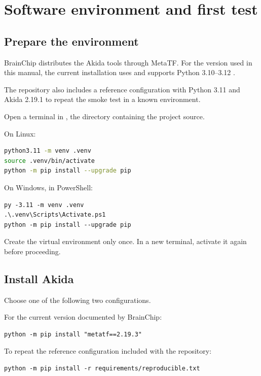 \chapter{Software environment and first test}
\label{chap:software}

\section{Prepare the environment}

BrainChip distributes the Akida tools through MetaTF. For the version used in this
manual, the current installation uses  and supports
Python 3.10--3.12 \cite{brainchip_install_2193}.

The repository also includes a reference configuration with Python 3.11 and
Akida 2.19.1 to repeat the smoke test in a known environment.

Open a terminal in \projectroot, the directory containing the project source.

On Linux:

\begin{lstlisting}[language=bash]
python3.11 -m venv .venv
source .venv/bin/activate
python -m pip install --upgrade pip
\end{lstlisting}

On Windows, in PowerShell:

\begin{lstlisting}
py -3.11 -m venv .venv
.\.venv\Scripts\Activate.ps1
python -m pip install --upgrade pip
\end{lstlisting}

Create the virtual environment only once. In a new terminal, activate it again
before proceeding.

\section{Install Akida}

Choose one of the following two configurations.

For the current version documented by BrainChip:

\begin{lstlisting}
python -m pip install "metatf==2.19.3"
\end{lstlisting}

To repeat the reference configuration included with the repository:

\begin{lstlisting}
python -m pip install -r requirements/reproducible.txt
\end{lstlisting}

